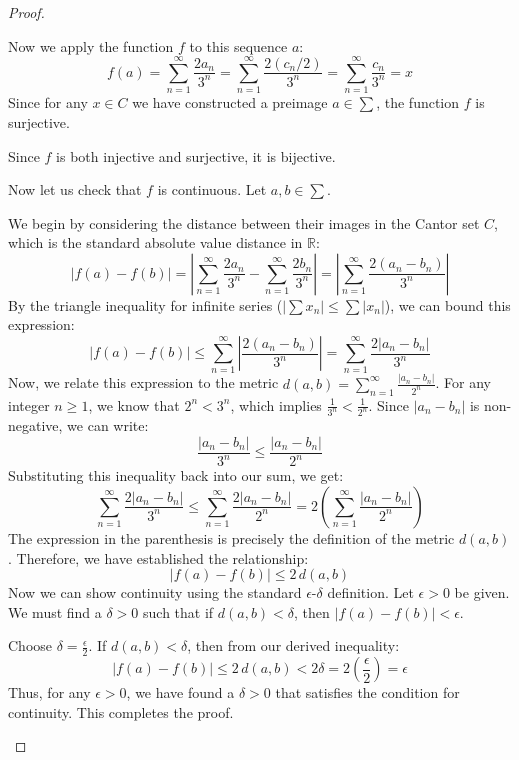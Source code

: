 \documentclass[11pt]{article}
\renewcommand{\_}[1]{\underline{ #1 }}
\theoremstyle{definition}
\numberwithin{equation}{subsection}
\begin{document}
\begin{proof}
\begin{enumerate}
Now we apply the function $f$ to this sequence $a$:
$$ f(a) = \sum_{n=1}^{\infty} \frac{2a_n}{3^n} = \sum_{n=1}^{\infty} \frac{2(c_n/2)}{3^n} = \sum_{n=1}^{\infty} \frac{c_n}{3^n} = x $$
Since for any $x \in C$ we have constructed a preimage $a \in \sum$, the function $f$ is surjective.

Since $f$ is both injective and surjective, it is bijective.

Now let us check that $f$ is continuous. Let $a,b\in \sum$. 

We begin by considering the distance between their images in the Cantor set $C$, which is the standard absolute value distance in $\mathbb{R}$:
$$|f(a) - f(b)| = \left| \sum_{n=1}^{\infty} \frac{2a_n}{3^n} - \sum_{n=1}^{\infty} \frac{2b_n}{3^n} \right| = \left| \sum_{n=1}^{\infty} \frac{2(a_n - b_n)}{3^n} \right|$$
By the triangle inequality for infinite series ($|\sum x_n| \le \sum |x_n|$), we can bound this expression:
$$|f(a) - f(b)| \le \sum_{n=1}^{\infty} \left| \frac{2(a_n - b_n)}{3^n} \right| = \sum_{n=1}^{\infty} \frac{2|a_n - b_n|}{3^n}$$
Now, we relate this expression to the metric $d(a,b) = \sum_{n=1}^\infty \frac{|a_n - b_n|}{2^n}$. For any integer $n \ge 1$, we know that $2^n < 3^n$, which implies $\frac{1}{3^n} < \frac{1}{2^n}$. Since $|a_n - b_n|$ is non-negative, we can write:
$$\frac{|a_n - b_n|}{3^n} \le \frac{|a_n - b_n|}{2^n}$$
Substituting this inequality back into our sum, we get:
$$\sum_{n=1}^{\infty} \frac{2|a_n - b_n|}{3^n} \le \sum_{n=1}^{\infty} \frac{2|a_n - b_n|}{2^n} = 2 \left( \sum_{n=1}^{\infty} \frac{|a_n - b_n|}{2^n} \right)$$
The expression in the parenthesis is precisely the definition of the metric $d(a,b)$. Therefore, we have established the relationship:
$$|f(a) - f(b)| \le 2 \, d(a,b)$$
Now we can show continuity using the standard $\epsilon$-$\delta$ definition. Let $\epsilon > 0$ be given. We must find a $\delta > 0$ such that if $d(a,b) < \delta$, then $|f(a) - f(b)| < \epsilon$.

Choose $\delta = \frac{\epsilon}{2}$.
If $d(a,b) < \delta$, then from our derived inequality:
$$|f(a) - f(b)| \le 2 \, d(a,b) < 2\delta = 2\left(\frac{\epsilon}{2}\right) = \epsilon$$
Thus, for any $\epsilon > 0$, we have found a $\delta > 0$ that satisfies the condition for continuity. This completes the proof.


    
\end{enumerate}

\end{proof}
\end{document}
